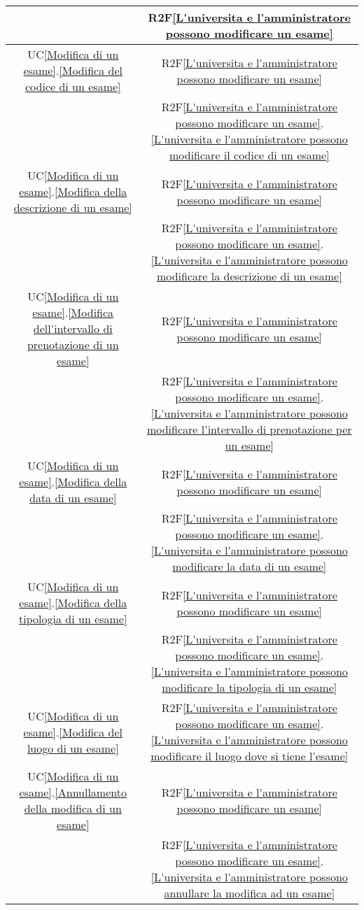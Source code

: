 \begin{longtable}{|c|c|}
& R2F\ref{L'universita e l'amministratore possono modificare un esame}\\
\hline
UC\ref{Modifica di un esame}.\ref{Modifica del codice di un esame} & R2F\ref{L'universita e l'amministratore possono modificare un esame}\\
& R2F\ref{L'universita e l'amministratore possono modificare un esame}.\ref{L'universita e l'amministratore possono modificare il codice di un esame}\\
\hline
UC\ref{Modifica di un esame}.\ref{Modifica della descrizione di un esame} & R2F\ref{L'universita e l'amministratore possono modificare un esame}\\
& R2F\ref{L'universita e l'amministratore possono modificare un esame}.\ref{L'universita e l'amministratore possono modificare la descrizione di un esame}\\
\hline
UC\ref{Modifica di un esame}.\ref{Modifica dell'intervallo di prenotazione di un esame} & R2F\ref{L'universita e l'amministratore possono modificare un esame}\\
& R2F\ref{L'universita e l'amministratore possono modificare un esame}.\ref{L'universita e l'amministratore possono modificare l'intervallo di prenotazione per un esame}\\
\hline
UC\ref{Modifica di un esame}.\ref{Modifica della data di un esame} & R2F\ref{L'universita e l'amministratore possono modificare un esame}\\
& R2F\ref{L'universita e l'amministratore possono modificare un esame}.\ref{L'universita e l'amministratore possono modificare la data di un esame}\\
\hline
UC\ref{Modifica di un esame}.\ref{Modifica della tipologia di un esame} & R2F\ref{L'universita e l'amministratore possono modificare un esame}\\
& R2F\ref{L'universita e l'amministratore possono modificare un esame}.\ref{L'universita e l'amministratore possono modificare la tipologia di un esame}\\
\hline
UC\ref{Modifica di un esame}.\ref{Modifica del luogo di un esame} & R2F\ref{L'universita e l'amministratore possono modificare un esame}.\ref{L'universita e l'amministratore possono modificare il luogo dove si tiene l'esame}\\
\hline
UC\ref{Modifica di un esame}.\ref{Annullamento della modifica di un esame} & R2F\ref{L'universita e l'amministratore possono modificare un esame}\\
& R2F\ref{L'universita e l'amministratore possono modificare un esame}.\ref{L'universita e l'amministratore possono annullare la modifica ad un esame}\\

\end{longtable}
